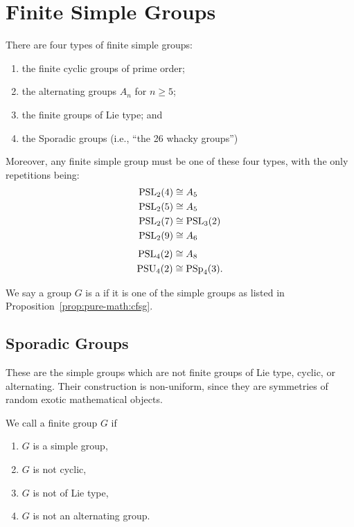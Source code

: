 \section{Finite Simple Groups}

\begin{proposition}\label{prop:pure-math:cfsg}
There are four types of finite simple groups:
\begin{enumerate}
\item the finite cyclic groups of prime order;
\item the alternating groups $A_{n}$ for $n\geq 5$;
\item the finite groups of Lie type; and
\item the Sporadic groups (i.e., ``the 26 whacky groups'')
\end{enumerate}
Moreover, any finite simple group must be one of these four types, with
the only repetitions being:
\begin{subequations}
  \begin{align}
    \mathrm{PSL}_{2}(4)&\cong A_{5}\\
    \mathrm{PSL}_{2}(5)&\cong A_{5}\\
    \mathrm{PSL}_{2}(7)&\cong\mathrm{PSL}_{3}(2)\\
    \mathrm{PSL}_{2}(9)&\cong A_{6}
  \end{align}
\end{subequations}\belowdisplayskip{}\abovedisplayskip
  \begin{align}
    \mathrm{PSL}_{4}(2)&\cong A_{8}\\
    \mathrm{PSU}_{4}(2)&\cong\mathrm{PSp}_{4}(3).
  \end{align}
\end{proposition}

\begin{definition}
We say a group $G$ is a  if it is one of the
simple groups as listed in Proposition~\ref{prop:pure-math:cfsg}.
\end{definition}

\subsection{Sporadic Groups}
These are the simple groups which are not finite groups of Lie type,
cyclic, or alternating. Their construction is non-uniform, since they
are symmetries of random exotic mathematical objects.

\begin{definition}
  We call a finite group $G$  if
  \begin{enumerate}
  \item $G$ is a simple group,
  \item $G$ is not cyclic,
  \item $G$ is not of Lie type,
  \item $G$ is not an alternating group.
  \end{enumerate}
\end{definition}

